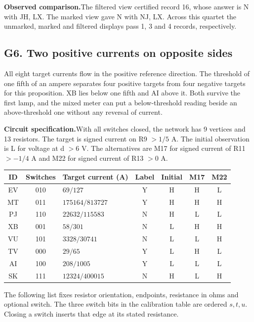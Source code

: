 \documentclass[12pt,letterpaper]{article}
\newcommand{\dossier}[2]{\clearpage\subsection*{#1}\phantomsection\label{#2}}
\newcommand{\reading}[2]{\par\smallskip\textsf{\color{accent}\bfseries #1}\enspace #2\par}
\begin{document}
\reading{Observed comparison.}{The filtered view certified record 16, whose answer is N with JH, LX. The marked view gave N with NJ, LX. Across this quartet the unmarked, marked and filtered displays pass 1, 3 and 4 records, respectively.}

\dossier{G6. Two positive currents on opposite sides}{netG6}

All eight target currents flow in the positive reference direction. The threshold of one fifth of an ampere separates four positive targets from four negative targets for this proposition. XB lies below one fifth and AI above it. Both survive the first lamp, and the mixed meter can put a below-threshold reading beside an above-threshold one without any reversal of current.

\reading{Circuit specification.}{With all switches closed, the network has 9 vertices and 13 resistors. The target is signed current on R9 $>1/5$ A. The initial observation is L for voltage at d $>6$ V. The alternatives are M17 for signed current of R11 $>-1/4$ A and M22 for signed current of R13 $>0$ A.}

\begin{center}{\small\setlength{\tabcolsep}{4pt}\begin{tabularx}{\linewidth}{@{}ccYcccc@{}}\toprule
ID & Switches & Target current (A) & Label & Initial & M17 & M22\\ \midrule
EV & 010 & $69/127$ & Y & H & H & L\\
MT & 011 & $175164/813727$ & Y & H & H & H\\
PJ & 110 & $22632/115583$ & N & H & L & L\\
XB & 001 & $58/301$ & N & L & H & H\\
VU & 101 & $3328/30741$ & N & L & L & H\\
TV & 000 & $29/65$ & Y & L & H & L\\
AI & 100 & $208/1005$ & Y & L & L & L\\
SK & 111 & $12324/400015$ & N & H & L & H\\\bottomrule\end{tabularx}}\end{center}

The following list fixes resistor orientation, endpoints, resistance in ohms and optional switch. The three switch bits in the calibration table are ordered $s,t,u$. Closing a switch inserts that edge at its stated resistance.
\end{document}
